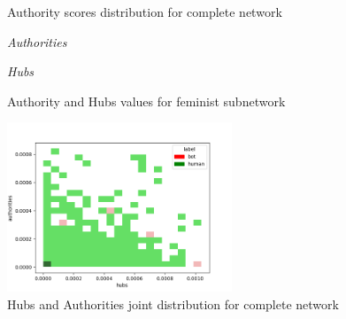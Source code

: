 \documentclass[12pt, a4paper]{article}
\begin{document}
\begin{itemize}
\begin{figure}[H]
                    \caption{Authority scores distribution for complete network}
                \end{figure}
                \begin{figure}[H]
    				\centering
    				\begin{minipage}[b]{0.49\textwidth}    				
        				\centering
        				\setlength{\fboxsep}{0pt}
    					\setlength{\fboxrule}{0.5pt}
        				\textit{\small Authorities}
    				\end{minipage}
    				\hfill
    				\begin{minipage}[b]{0.49\textwidth}
        				\centering
        				\setlength{\fboxsep}{0pt}
    					\setlength{\fboxrule}{0.5pt}
        				\textit{\small Hubs}
    				\end{minipage}
    				\caption{Authority and Hubs values for feminist subnetwork}
				\end{figure}
                \begin{figure}[H]
                    \centering
                    \includegraphics[width=0.6\textwidth]{results/complete_hubs&authorities.png}
                    \caption{Hubs and Authorities joint distribution for complete network}
                    \label{fig:joint_distribution}
                \end{figure}
		\end{itemize}
\end{document}
